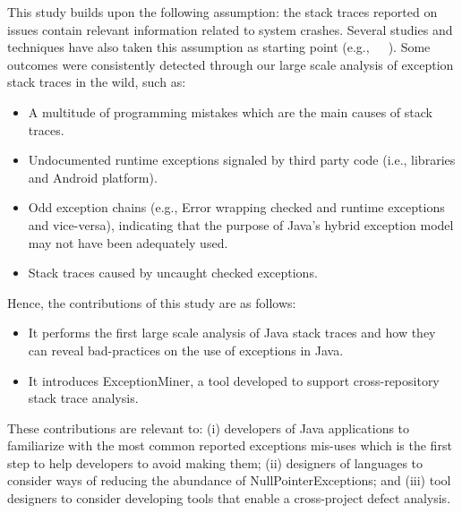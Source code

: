 \documentclass[conference]{IEEEtran}
\begin{document}
This study builds upon the following assumption: the stack traces reported on
issues contain relevant information related to system crashes. Several studies
and techniques have also taken this assumption as starting point
(e.g.,~\cite{sinha2009fault}~\cite{dhaliwal2011classifying}~\cite{kim2013predicting}). Some outcomes were consistently detected through
our large scale analysis of exception stack traces in the wild, such as:

\begin{itemize}

  \item  A multitude of programming mistakes which are the main causes of stack traces.
   
  \item Undocumented runtime exceptions signaled by third party
    code (i.e., libraries and Android platform).

  \item  Odd exception chains (e.g., Error wrapping checked and runtime
    exceptions and vice-versa), indicating that the purpose of Java's hybrid
    exception model may not have been adequately used.

  \item  Stack traces caused by uncaught checked exceptions.

\end{itemize}

Hence, the contributions of this study are as follows:
\begin{itemize}

  \item  It performs the first large scale analysis of Java stack traces and how
    they can reveal bad-practices on the use of exceptions in Java.

  \item  It introduces ExceptionMiner, a tool developed to support cross-repository stack trace
    analysis.

\end{itemize}

These contributions are relevant to:
(i) developers of Java applications
to familiarize with the most common reported exceptions mis-uses which is the
first step to help developers to avoid making them; 
(ii) designers of languages
to consider ways of reducing the abundance of NullPointerExceptions;
and (iii)
tool designers to consider developing tools that enable a cross-project defect
analysis. 

\end{document}
